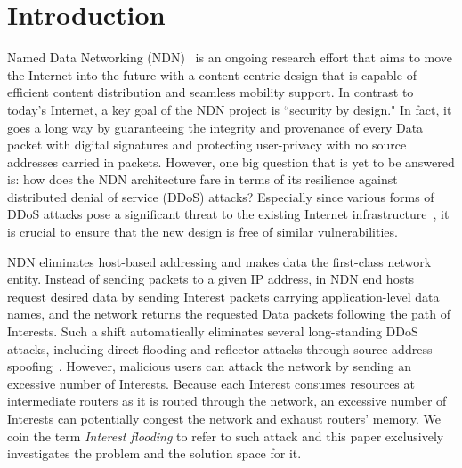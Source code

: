 \section{Introduction}
\label{sec:intro}





Named Data Networking (NDN)~\cite{ndn-conext, ndn-tr} is an ongoing research effort that aims to move the Internet into the future with a content-centric design that is capable of efficient content distribution and seamless mobility support. 
In contrast to today's Internet, a key goal of the NDN project is ``security by design." In fact, it goes a long way by guaranteeing the integrity and provenance of every Data packet with digital signatures and protecting user-privacy with no source addresses carried in packets. However, one big question that is yet to be answered is: how does the NDN architecture fare in terms of its resilience against distributed denial of service (DDoS) attacks? Especially since various forms of DDoS attacks pose a significant threat to the existing Internet infrastructure~\cite{arbor-report}, it is crucial to ensure that the new design is free of similar vulnerabilities.

NDN eliminates host-based addressing and makes data the first-class network entity. 
Instead of sending packets to a given IP address, in NDN end hosts request desired data by sending Interest packets carrying application-level data names, and the network returns the requested Data packets following the path of Interests. 
Such a shift automatically eliminates several long-standing DDoS attacks, including direct flooding and reflector attacks through source address spoofing~\cite{mirkovic2004taxonomy}.
%
However, malicious users can attack the network by sending an excessive number of Interests. 
Because each Interest consumes resources at intermediate routers as it is routed through the network, an excessive number of Interests can potentially congest the network and exhaust routers' memory. 
We coin the term {\it Interest flooding} to refer to such attack and
this paper exclusively investigates the problem and the solution space for it. 

